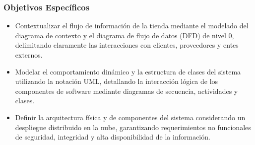\subsubsection{Objetivos Específicos}
\begin{itemize}
    \item Contextualizar el flujo de información de la tienda mediante el modelado del diagrama de contexto y el diagrama de flujo de datos (DFD) de nivel 0, delimitando claramente las interacciones con clientes, proveedores y entes externos.
    \item Modelar el comportamiento dinámico y la estructura de clases del sistema utilizando la notación UML, detallando la interacción lógica de los componentes de software mediante diagramas de secuencia, actividades y clases.
    \item Definir la arquitectura física y de componentes del sistema considerando un despliegue distribuido en la nube, garantizando requerimientos no funcionales de seguridad, integridad y alta disponibilidad de la información.
\end{itemize}
